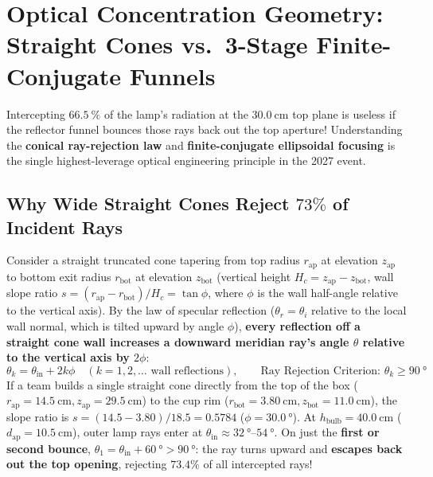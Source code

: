 \section{Optical Concentration Geometry: Straight Cones vs.\ 3-Stage Finite-Conjugate Funnels}\label{sec:15.3}

Intercepting $\SI{66.5}{\percent}$ of the lamp's radiation at the $\SI{30.0}{\centi\meter}$ top plane is useless if the reflector funnel bounces those rays back out the top aperture! Understanding the \textbf{conical ray-rejection law} and \textbf{finite-conjugate ellipsoidal focusing} is the single highest-leverage optical engineering principle in the 2027 event.

\subsection{Why Wide Straight Cones Reject $73\%$ of Incident Rays}
Consider a straight truncated cone tapering from top radius $r_{\mathrm{ap}}$ at elevation $z_{\mathrm{ap}}$ to bottom exit radius $r_{\mathrm{bot}}$ at elevation $z_{\mathrm{bot}}$ (vertical height $H_c = z_{\mathrm{ap}} - z_{\mathrm{bot}}$, wall slope ratio $s = (r_{\mathrm{ap}} - r_{\mathrm{bot}})/H_c = \tan\phi$, where $\phi$ is the wall half-angle relative to the vertical axis). By the law of specular reflection ($\theta_r = \theta_i$ relative to the local wall normal, which is tilted upward by angle $\phi$), \textbf{every reflection off a straight cone wall increases a downward meridian ray's angle $\theta$ relative to the vertical axis by $2\phi$}:
\begin{equation}\label{eq:15:cone-bounce}
  \theta_k = \theta_{\mathrm{in}} + 2k\phi \quad (k = 1, 2, \dots\text{ wall reflections}), \qquad \text{Ray Rejection Criterion: } \theta_k \ge \SI{90}{\degree}
\end{equation}
If a team builds a single straight cone directly from the top of the box ($r_{\mathrm{ap}} = \SI{14.5}{\centi\meter}, z_{\mathrm{ap}} = \SI{29.5}{\centi\meter}$) to the cup rim ($r_{\mathrm{bot}} = \SI{3.80}{\centi\meter}, z_{\mathrm{bot}} = \SI{11.0}{\centi\meter}$), the slope ratio is $s = (14.5 - 3.80)/18.5 = 0.5784$ ($\phi = \SI{30.0}{\degree}$). At $h_{\mathrm{bulb}} = \SI{40.0}{\centi\meter}$ ($d_{\mathrm{ap}} = \SI{10.5}{\centi\meter}$), outer lamp rays enter at $\theta_{\mathrm{in}} \approx \SIrange{32}{54}{\degree}$. On just the \textbf{first or second bounce}, $\theta_1 = \theta_{\mathrm{in}} + \SI{60}{\degree} > \SI{90}{\degree}$: the ray turns upward and \textbf{escapes back out the top opening}, rejecting $73.4\%$ of all intercepted rays!

